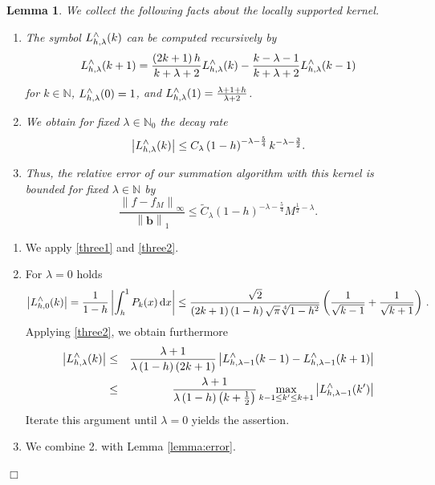 \documentclass[11pt,a4paper,twoside,bibtotoc]{scrartcl}
\theoremstyle{plain}
\newtheorem{lemma}[theorem]{Lemma}
\theoremstyle{definition}
\theoremstyle{remark}
\newenvironment{proof}{{\bf Proof.}}{$\Box$}
\newcommand{\N}{\ensuremath{\mathbb{N}}}
\newcommand{\NZ}{\ensuremath{\mathbb{N}_{0}}}
\newcommand{\fun}[2]{\ensuremath{#1{\hspace{-0.4ex}}\left(#2\right)}}
\newcommand{\paren}[1]{\ensuremath{\left(#1\right)}}
\newcommand{\mb}[1]{\mathbf{#1}}
\newcommand{\V}[1]{\mb{#1}}
\newcommand{\dx}{\text{\rm{d}}}
\numberwithin{equation}{section}
\numberwithin{table}{section}
\numberwithin{figure}{section}
\begin{document}
\begin{lemma}
  We collect the following facts about the locally supported kernel.
  \begin{enumerate}
  \item The symbol $\fun{L_{h,\lambda}^{\wedge}}{k}$ can be computed recursively by
    \[
    \fun{L_{h,\lambda}^{\wedge}}{k+1} = \frac{\paren{2k+1} h}{k+\lambda+2}
    \fun{L_{h,\lambda}^{\wedge}}{k}   - \frac{k-\lambda-1}{k+\lambda+2}
    \fun{L_{h,\lambda}^{\wedge}}{k-1}
    \]
    for $k\in \N$, $\fun{L_{h,\lambda}^{\wedge}}{0} = 1$, and
    $\fun{L_{h,\lambda}^{\wedge}}{1} = \frac{\lambda + 1 + h}{\lambda+2}$.
  \item We obtain for fixed $\lambda \in \NZ$ the decay rate
    \[
    \left|\fun{L_{h,\lambda}^{\wedge}}{k}\right| \le C_{\lambda}
    \left(1-h\right)^{-\lambda-\frac{5}{4}} k^{-\lambda-\frac{3}{2}}.
    \]
  \item Thus, the relative error of our summation algorithm with this kernel
  is bounded for fixed $\lambda \in \N$ by
  \begin{equation}
    \label{error:Lh}
    \frac{\left\|f - f_{M}\right\|_{\infty}}{\left\|\V{b}\right\|_1} \le
    \tilde C_{\lambda} \left(1-h\right)^{-\lambda-\frac{5}{4}} M^{\frac{1}{2}-\lambda}.
  \end{equation}
  \end{enumerate}
\end{lemma}
\begin{proof}
  \begin{enumerate}
  \item We apply \eqref{three1} and \eqref{three2}.
  \item For $\lambda=0$ holds
    \[
    \left|\fun{L_{h,0}^{\wedge}}{k}\right| = \frac{1}{1-h}
    \left|\int_{h}^{1} \fun{P_{k}}{x} \dx x\right| \le
    \frac{\sqrt{2}}{\left(2k+1\right)\left(1-h\right)\sqrt{\pi}\sqrt[4]{1-h^2}}
    \left(\frac{1}{\sqrt{k-1}}+\frac{1}{\sqrt{k+1}}\right)\,.
    \]
    Applying \eqref{three2}, we obtain furthermore
    \begin{eqnarray*}
      \left|\fun{L_{h,\lambda}^{\wedge}}{k}\right| &\le&
      \frac{\lambda+1}{\lambda\left(1-h\right)\left(2k+1\right)}
      \left|\fun{L_{h,\lambda-1}^{\wedge}}{k-1}-
        \fun{L_{h,\lambda-1}^{\wedge}}{k+1}\right|\\ &\le&
      \frac{\lambda+1}{\lambda\left(1-h\right)\left(k+\frac{1}{2}\right)}
      \max\limits_{k-1\le k'\le k+1}
      \left|\fun{L_{h,\lambda-1}^{\wedge}}{k'}\right|
    \end{eqnarray*}
    Iterate this argument until $\lambda=0$ yields the assertion.
  \item We combine 2. with Lemma \ref{lemma:error}. 
  \end{enumerate}
\end{proof}
\end{document}

